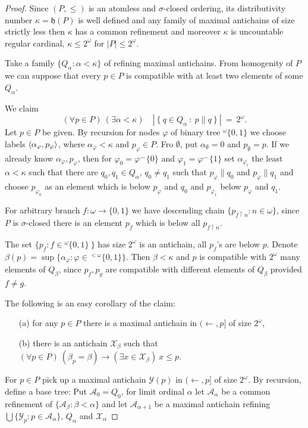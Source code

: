 \begin{proof}
 Since $(P,\leq)$ is an atomless and $\sigma$-closed ordering, its distributivity
number $\kappa = \mathfrak h(P)$ is well defined and any family of maximal
antichains of size strictly less then $\kappa$ has a common refinement and
moreover $\kappa$ is uncountable regular cardinal, $\kappa \leq 2^\omega$ for
$|P| \leq 2^\omega$.

Take a family $\{Q_\alpha : \alpha < \kappa\}$ of refining maximal
antichains. From homogenity of $P$ we can suppose that every $p \in P$ is
compatible with at least two elements of some $Q_\alpha$.

We claim
$$
(\forall p \in P) \ (\exists \alpha < \kappa) \quad
	|\ \{\ q \in Q_\alpha \ : \ p \parallel q \  \} \ | \ = \ 2^\omega.
$$
Let $p \in P$ be given. By recursion for nodes $\varphi$ of binary tree
${}^\omega \{ 0,1 \}$ we choose labels $\langle \alpha_\varphi, p_\varphi \rangle$,
where $\alpha_\varphi < \kappa$ and $p_\varphi \in P$. Fro $\emptyset$,
put $\alpha_\emptyset = 0$ and $p_\emptyset = p$. If we already know
$\alpha_\varphi, p_\varphi$, then for $\varphi_0 = \varphi^\smallfrown \{0\}$
and $\varphi_1 = \varphi^\smallfrown \{1\}$ set $\alpha_{\varphi_i}$
the least $\alpha < \kappa$  such that there are $q_0, q_1 \in Q_\alpha$,
$q_0 \not = q_1$ such that $p_\varphi \parallel q_0$ and $p_\varphi \parallel q_1$
and choose $p_{\varphi_0}$ as an element which is below $p_\varphi$ and $q_0$
and $p_{\varphi_1}$ below $p_\varphi$ and $q_1$.

For arbitrary branch $f : \omega \to \{0,1\}$ we have descending chain
$\{p_{f \upharpoonright n} : n \in \omega \}$, since $P$ is $\sigma$-closed
there is an element $p_f$ which is below all $p_{f \upharpoonright n}$.

The set $\{ p_f : f \in {}^\omega \{0,1 \} \ \}$  has size $2^\omega$ is
an antichain, all $p_f$'s are below $p$.  Denote
$\beta(p) = \sup \{\alpha_\varphi : \varphi \in {}^{< \omega} \{0,1 \} \}$.
Then $\beta < \kappa$ and $p$ is compatible with $2^\omega$ many elements
of $Q_\beta$, since $p_f, p_g$ are compatible with different elements of $Q_\beta$
provided $f \not = g$.

\smallskip

The following is an easy corollary of the claim:
\begin{itemize}
 \item[(a)] for any $p \in P$ there is a maximal antichain in $(\leftarrow,p]$ of
	size $2^\omega$,
 \item[(b)] there is an antichain $\mathcal X_\beta$ such that
	$(\forall p \in P) \ (\beta_p = \beta) \rightarrow
	(\exists x \in \mathcal X_\beta) \ x \leq p$.
\end{itemize}

For $p \in P$ pick up a maximal antichain $\mathcal Y(p)$ in $(\leftarrow,p]$
of size $2^\omega$. By recursion, define a base tree: Put $\mathcal A_0 = Q_0$,
for limit ordinal $\alpha$  let $\mathcal A_\alpha$ be a common refinement of
$\{ \mathcal A_\beta : \beta < \alpha \}$ and
let $\mathcal A_{\alpha +1}$ be a maximal antichain refining
$\bigcup \{\mathcal Y_p : p \in \mathcal A_\alpha \}$, $Q_\alpha$ and $\mathcal X_\alpha$
\end{proof}

